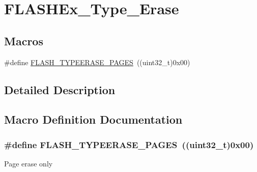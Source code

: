 \hypertarget{group___f_l_a_s_h_ex___type___erase}{\section{F\-L\-A\-S\-H\-Ex\-\_\-\-Type\-\_\-\-Erase}
\label{group___f_l_a_s_h_ex___type___erase}
}
\subsection*{Macros}
\begin{DoxyCompactItemize}
\item 
\#define \hyperlink{group___f_l_a_s_h_ex___type___erase_ga3664ce55155ec4990873c51737d787ce}{F\-L\-A\-S\-H\-\_\-\-T\-Y\-P\-E\-E\-R\-A\-S\-E\-\_\-\-P\-A\-G\-E\-S}~((uint32\-\_\-t)0x00)
\end{DoxyCompactItemize}


\subsection{Detailed Description}


\subsection{Macro Definition Documentation}
\hypertarget{group___f_l_a_s_h_ex___type___erase_ga3664ce55155ec4990873c51737d787ce}{
\subsubsection[{F\-L\-A\-S\-H\-\_\-\-T\-Y\-P\-E\-E\-R\-A\-S\-E\-\_\-\-P\-A\-G\-E\-S}]{\setlength{\rightskip}{0pt plus 5cm}\#define F\-L\-A\-S\-H\-\_\-\-T\-Y\-P\-E\-E\-R\-A\-S\-E\-\_\-\-P\-A\-G\-E\-S~((uint32\-\_\-t)0x00)}}\label{group___f_l_a_s_h_ex___type___erase_ga3664ce55155ec4990873c51737d787ce}
Page erase only 